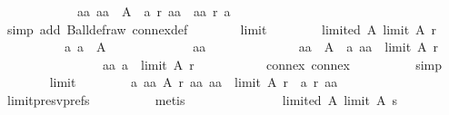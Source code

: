 \begin{isabellebody}
\ \ \ \ \ \ \ \ \ \ \ \ {\isacharparenleft}{\kern0pt}{\isasymforall}aa{\isachardot}{\kern0pt}\ aa\ {\isasymin}\ A\ {\isasymlongrightarrow}\ a\ {\isasympreceq}\isactrlsub r\ aa\ {\isasymor}\ aa\ {\isasympreceq}\isactrlsub r\ a{\isacharparenright}{\kern0pt}{\isacharparenright}{\kern0pt}{\isacharparenright}{\kern0pt}{\isachardoublequoteclose}\isanewline
\ \ \ \ \ \ \ \ \isamarkupfalse%
\ {\isacharparenleft}{\kern0pt}simp\ add{\isacharcolon}{\kern0pt}\ Ball{\isacharunderscore}{\kern0pt}def{\isacharunderscore}{\kern0pt}raw\ connex{\isacharunderscore}{\kern0pt}def{\isacharparenright}{\kern0pt}\isanewline
\ \ \ \ \ \ \isamarkupfalse%
\ limit{}{\isacharcolon}{\kern0pt}\isanewline
\ \ \ \ \ \ \ \ {\isachardoublequoteopen}limited\ A\ {\isacharparenleft}{\kern0pt}limit\ A\ r{\isacharparenright}{\kern0pt}\ {\isasymand}\isanewline
\ \ \ \ \ \ \ \ \ \ {\isacharparenleft}{\kern0pt}{\isasymforall}a{\isachardot}{\kern0pt}\ a\ {\isasymnotin}\ A\ {\isasymor}\isanewline
\ \ \ \ \ \ \ \ \ \ \ \ {\isacharparenleft}{\kern0pt}{\isasymforall}aa{\isachardot}{\kern0pt}\isanewline
\ \ \ \ \ \ \ \ \ \ \ \ \ \ aa\ {\isasymnotin}\ A\ {\isasymor}\ {\isacharparenleft}{\kern0pt}a{\isacharcomma}{\kern0pt}\ aa{\isacharparenright}{\kern0pt}\ {\isasymin}\ limit\ A\ r\ {\isasymor}\isanewline
\ \ \ \ \ \ \ \ \ \ \ \ \ \ \ \ {\isacharparenleft}{\kern0pt}aa{\isacharcomma}{\kern0pt}\ a{\isacharparenright}{\kern0pt}\ {\isasymin}\ limit\ A\ r\ {\isacharparenright}{\kern0pt}{\isacharparenright}{\kern0pt}{\isachardoublequoteclose}\isanewline
\ \ \ \ \ \ \ \ \isamarkupfalse%
\ connex\ connex{}\isanewline
\ \ \ \ \ \ \ \ \isamarkupfalse%
\ simp\isanewline
\ \ \ \ \ \ \isamarkupfalse%
\ limit{}{\isacharcolon}{\kern0pt}\isanewline
\ \ \ \ \ \ \ \ {\isachardoublequoteopen}{\isasymforall}a\ aa\ A\ r{\isachardot}{\kern0pt}\ {\isacharparenleft}{\kern0pt}a{\isacharcolon}{\kern0pt}{\isacharcolon}{\kern0pt}{\isacharprime}{\kern0pt}a{\isacharcomma}{\kern0pt}\ aa{\isacharparenright}{\kern0pt}\ {\isasymnotin}\ limit\ A\ r\ {\isasymor}\ a\ {\isasympreceq}\isactrlsub r\ aa{\isachardoublequoteclose}\isanewline
\ \ \ \ \ \ \ \ \isamarkupfalse%
\ limit{\isacharunderscore}{\kern0pt}presv{\isacharunderscore}{\kern0pt}prefs{}\isanewline
\ \ \ \ \ \ \ \ \isamarkupfalse%
\ metis\isanewline
\ \ \ \ \ \ \isamarkupfalse%
\isanewline
\ \ \ \ \ \ \ \ {\isachardoublequoteopen}limited\ A\ {\isacharparenleft}{\kern0pt}limit\ A\ s{\isacharparenright}{\kern0pt}\ {\isasymand}\isanewline

\end{isabellebody}
